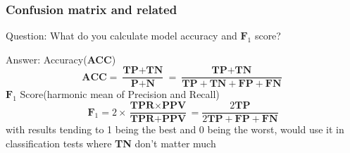 \documentclass[11pt]{beamer}
\begin{document}
\begin{frame}
\frametitle{Confusion matrix and related}
\begin{block}{Question:}
	What do you calculate model accuracy and $\textbf{F}_1$ score?
\end{block}
\begin{block}{Answer:}
	Accuracy(\textbf{ACC})
	\[
		\textbf{ACC} = \frac{\textbf{TP}+\textbf{TN}}{\textbf{P}+\textbf{N}} = \frac{\textbf{TP}+\textbf{TN}}{\textbf{TP}+\textbf{TN} + \textbf{FP}+\textbf{FN}}
	\]
	$\textbf{F}_1$ Score(harmonic mean of Precision and Recall)
	\[
		\textbf{F}_1 = 2\times\frac{\textbf{TPR}\times\textbf{PPV}}{\textbf{TPR} + \textbf{PPV}} = \frac{2\textbf{TP}}{2\textbf{TP}+\textbf{FP}+\textbf{FN}}
	\]
	with results tending to 1 being the best and 0 being the worst, would use it in classification tests where \textbf{TN} don't matter much
\end{block}
\end{frame}
\end{document}
